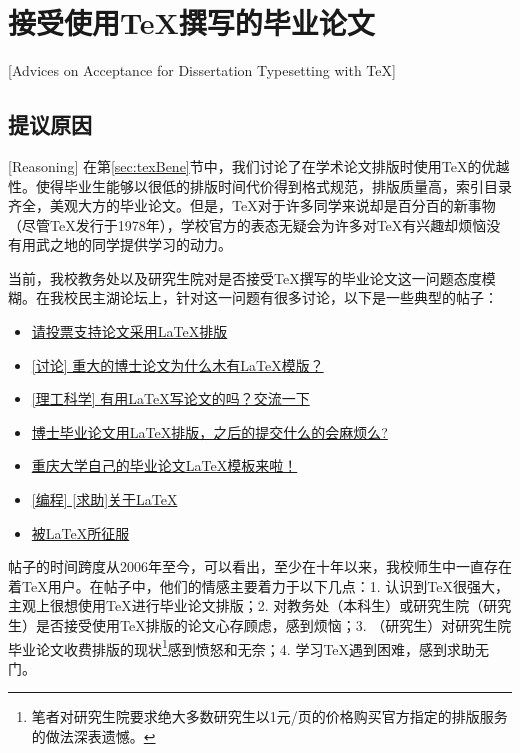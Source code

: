 \section{接受使用\TeX 撰写的毕业论文}[Advices on Acceptance for Dissertation Typesetting with \TeX]
\subsection{提议原因}[Reasoning]
在第\ref{sec:texBene}节中，我们讨论了在学术论文排版时使用\TeX 的优越性。\cquthesis 使得毕业生能够以很低的排版时间代价得到格式规范，排版质量高，索引目录齐全，美观大方的毕业论文。但是，\TeX 对于许多同学来说却是百分百的新事物（尽管\TeX 发行于1978年），学校官方的表态无疑会为许多对\TeX 有兴趣却烦恼没有用武之地的同学提供学习的动力。

当前，我校教务处以及研究生院对是否接受\TeX 撰写的毕业论文这一问题态度模糊。在我校民主湖论坛上，针对这一问题有很多讨论，以下是一些典型的帖子：
\begin{itemize}
	\item \href{http://www.cqumzh.cn/bbs/forum.php?mod=viewthread&tid=830829}{请投票支持论文采用\LaTeX 排版}
	\item \href{http://www.cqumzh.cn/bbs/forum.php?mod=viewthread&tid=830608}{[讨论] 重大的博士论文为什么木有\LaTeX 模版？}
	\item \href{http://www.cqumzh.cn/bbs/forum.php?mod=viewthread&tid=264031}{[理工科学] 有用\LaTeX 写论文的吗？交流一下 }
	\item \href{http://www.cqumzh.cn/bbs/forum.php?mod=viewthread&tid=931065}{博士毕业论文用\LaTeX 排版，之后的提交什么的会麻烦么?}
	\item \href{http://www.cqumzh.cn/bbs/forum.php?mod=viewthread&tid=936958}{重庆大学自己的毕业论文\LaTeX 模板来啦！}
	\item \href{http://www.cqumzh.cn/bbs/forum.php?mod=viewthread&tid=615852}{[编程] [求助]关于\LaTeX}
	\item \href{http://www.cqumzh.cn/bbs/forum.php?mod=viewthread&tid=818609}{被\LaTeX 所征服}
\end{itemize}

帖子的时间跨度从2006年至今，可以看出，至少在十年以来，我校师生中一直存在着\TeX 用户。在帖子中，他们的情感主要着力于以下几点：1. 认识到\TeX 很强大，主观上很想使用\TeX 进行毕业论文排版；2. 对教务处（本科生）或研究生院（研究生）是否接受使用\TeX 排版的论文心存顾虑，感到烦恼；3. （研究生）对研究生院毕业论文收费排版的现状\footnote{笔者对研究生院要求绝大多数研究生以1元/页的价格购买官方指定的排版服务的做法深表遗憾。}感到愤怒和无奈；4. 学习\TeX 遇到困难，感到求助无门。

